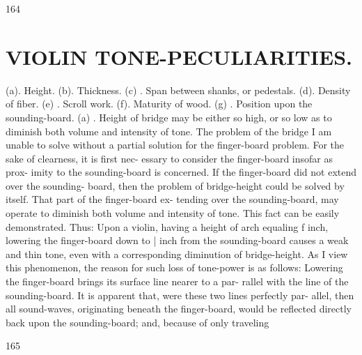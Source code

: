 \documentclass{article}
\begin{document}
164

\section*{VIOLIN TONE-PECULIARITIES.}
(a). Height. (b). Thickness. (c) . Span between shanks, or pedestals. (d). Density of fiber. (e) . Scroll work. (f). Maturity of wood. (g) . Position upon the sounding-board. (a) . Height of bridge may be either so high, or so low as to diminish both volume and intensity of tone. The problem of the bridge I am unable to solve without a partial solution for the finger-board problem. For the sake of clearness, it is first nec- essary to consider the finger-board insofar as prox- imity to the sounding-board is concerned. If the finger-board did not extend over the sounding- board, then the problem of bridge-height could be solved by itself. That part of the finger-board ex- tending over the sounding-board, may operate to diminish both volume and intensity of tone. This fact can be easily demonstrated. Thus: Upon a violin, having a height of arch equaling f inch, lowering the finger-board down to | inch from the sounding-board causes a weak and thin tone, even with a corresponding diminution of bridge-height. As I view this phenomenon, the reason for such loss of tone-power is as follows: Lowering the finger-board brings its surface line nearer to a par- rallel with the line of the sounding-board. It is apparent that, were these two lines perfectly par- allel, then all sound-waves, originating beneath the finger-board, would be reflected directly back upon the sounding-board; and, because of only traveling

165
\end{document}
